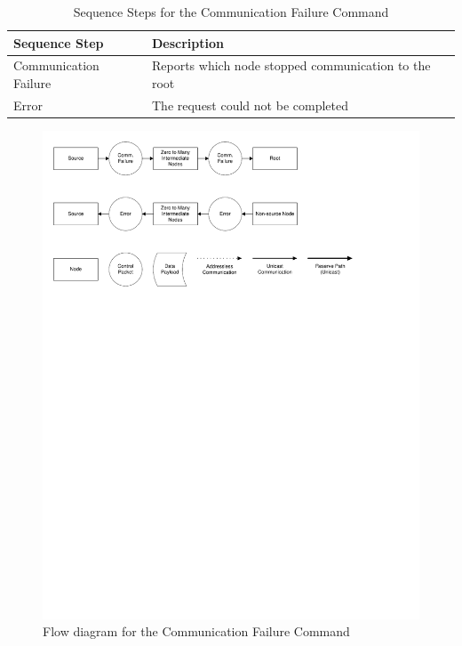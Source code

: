 \begin{table}
	\begin{center}
		\setlength{\extrarowheight}{1.5pt}
		\caption{Sequence Steps for the Communication Failure Command}
		\vspace{0.1cm}
		\begin{tabular} {|l|l|}
			\hline
			\textbf{Sequence Step} & \textbf{Description} \\
			\hline
			\hline
			Communication Failure & Reports which node stopped communication to the root \\
			\hline
			Error & The request could not be completed \\
			\hline
		\end{tabular}
		\label{tab:protocol:comm_failure}
	\end{center}
\end{table}

\begin{figure}[ptb]
	\begin{centering}
		\includegraphics[scale=0.75]{Protocol/Figures/protocol-comm_failure.pdf}
		\caption{Flow diagram for the Communication Failure Command}
		\label{fig:protocol:comm_failure}
	\end{centering}
\end{figure}

